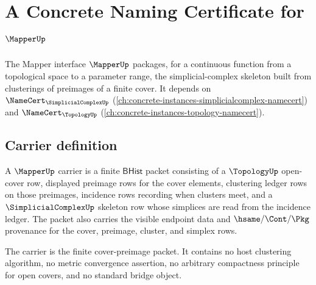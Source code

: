 \chapter{A Concrete Naming Certificate for $\MapperUp$}
\label{ch:concrete-instances-mapper-namecert}

The Mapper interface $\MapperUp$ packages, for a continuous function from a topological space to a parameter range, the simplicial-complex skeleton built from clusterings of preimages of a finite cover. It depends on $\NameCert_{\SimplicialComplexUp}$ (\autoref{ch:concrete-instances-simplicialcomplex-namecert}) and $\NameCert_{\TopologyUp}$ (\autoref{ch:concrete-instances-topology-namecert}).

\section{Carrier definition}
\label{sec:mapper-carrier}

\begin{definition}
\label{def:mapper-cover-preimage-carrier}
A $\MapperUp$ carrier is a finite $\mathsf{BHist}$ packet consisting of a
$\TopologyUp$ open-cover row, displayed preimage rows for the cover elements,
clustering ledger rows on those preimages, incidence rows recording when
clusters meet, and a $\SimplicialComplexUp$ skeleton row whose simplices are
read from the incidence ledger. The packet also carries the visible endpoint
data and $\hsame/\Cont/\Pkg$ provenance for the cover, preimage, cluster, and
simplex rows.

The carrier is the finite cover-preimage packet. It contains no host
clustering algorithm, no metric convergence assertion, no arbitrary
compactness principle for open covers, and no standard bridge object.
\end{definition}

